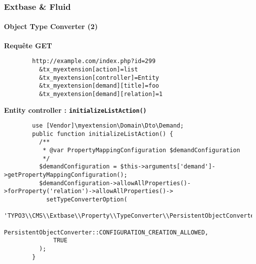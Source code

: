 
\begin{frame}[fragile]
	\frametitle{Extbase \& Fluid}
	\framesubtitle{Object Type Converter (2)}

	\lstset{
		basicstyle=\tiny\ttfamily
	}

	\smaller\textbf{Requête GET}\normalsize
	\begin{lstlisting}
		http://example.com/index.php?id=299
		  &tx_myextension[action]=list
		  &tx_myextension[controller]=Entity
		  &tx_myextension[demand][title]=foo
		  &tx_myextension[demand][relation]=1
	\end{lstlisting}

	\smaller\textbf{Entity controller : \texttt{initializeListAction()}}\normalsize
	\begin{lstlisting}
		use [Vendor]\myextension\Domain\Dto\Demand;
		public function initializeListAction() {
		  /**
		   * @var PropertyMappingConfiguration $demandConfiguration
		   */
		  $demandConfiguration = $this->arguments['demand']->getPropertyMappingConfiguration();
		  $demandConfiguration->allowAllProperties()->forProperty('relation')->allowAllProperties()->
		    setTypeConverterOption(
		      'TYPO3\\CMS\\Extbase\\Property\\TypeConverter\\PersistentObjectConverter',
		      PersistentObjectConverter::CONFIGURATION_CREATION_ALLOWED,
		      TRUE
		  );
		}
	\end{lstlisting}

\end{frame}


